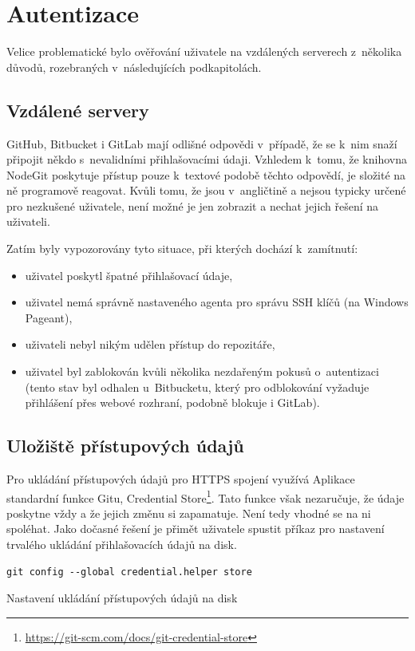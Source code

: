 \section{Autentizace}

Velice problematické bylo ověřování uživatele na vzdálených serverech z~několika důvodů, rozebraných v~následujících podkapitolách.

\subsection{Vzdálené servery}

GitHub, Bitbucket i GitLab mají odlišné odpovědi v~případě, že se k~nim snaží připojit někdo s~nevalidními přihlašovacími údaji. Vzhledem k~tomu, že knihovna NodeGit poskytuje přístup pouze k~textové podobě těchto odpovědí, je složité na ně programově reagovat. Kvůli tomu, že jsou v~angličtině a nejsou typicky určené pro nezkušené uživatele, není možné je jen zobrazit a nechat jejich řešení na uživateli.

Zatím byly vypozorovány tyto situace, při kterých dochází k~zamítnutí:

\begin{itemize}
	\item uživatel poskytl špatné přihlašovací údaje,
	\item uživatel nemá správně nastaveného agenta pro správu SSH klíčů (na Windows Pageant),
	\item uživateli nebyl nikým udělen přístup do repozitáře,
	\item uživatel byl zablokován kvůli několika nezdařeným pokusů o~autentizaci (tento stav byl odhalen u~Bitbucketu, který pro odblokování vyžaduje přihlášení přes webové rozhraní, podobně blokuje i GitLab).
\end{itemize}

\subsection{Uložiště přístupových údajů}

Pro ukládání přístupových údajů pro HTTPS spojení využívá Aplikace standardní funkce Gitu, Credential Store\footnote{\url{https://git-scm.com/docs/git-credential-store}}. Tato funkce však nezaručuje, že údaje poskytne vždy a že jejich změnu si zapamatuje. Není tedy vhodné se na ni spoléhat. Jako dočasné řešení je přimět uživatele spustit příkaz pro nastavení trvalého ukládání přihlašovacích údajů na disk.

\FloatBarrier
\begin{listing}[ht]
	\begin{verbatim}
git config --global credential.helper store
	\end{verbatim}
	\caption{Nastavení ukládání přístupových údajů na disk}
\end{listing}
\FloatBarrier

